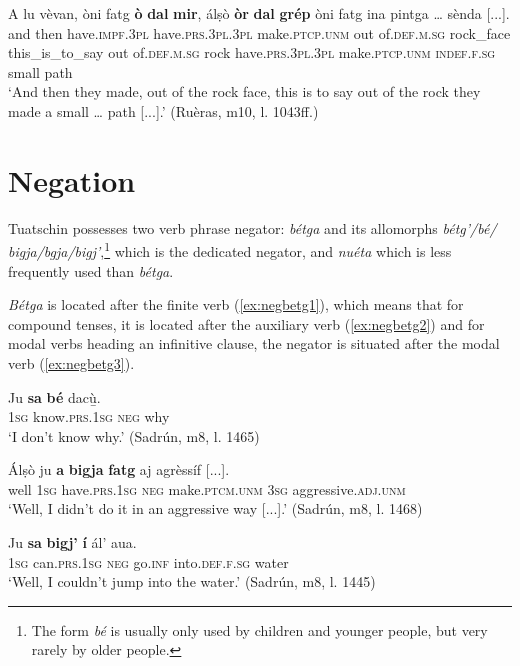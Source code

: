 \ea
\label{ex:instr:orda}
\gll  A lu vèvan, òni fatg \textbf{ò} \textbf{dal} \textbf{mir}, álṣò \textbf{òr} \textbf{dal} \textbf{grép} òni fatg ina pintga …  sènda [...].\\
and then have.\textsc{impf.3pl} have.\textsc{prs.3pl.3pl} make.\textsc{ptcp.unm} out of.\textsc{def.m.sg} rock\_face this\_is\_to\_say out of.\textsc{def.m.sg} rock have.\textsc{prs.3pl.3pl} make.\textsc{ptcp.unm} \textsc{indef.f.sg} small {} path\\
\glt `And then they made, out of the rock face, this is to say out of the rock they made a small … path [...].' (Ruèras, m10, l. 1043ff.)
\z 


\section{Negation}
Tuatschin possesses two verb phrase negator: \textit{bétga} and its allomorphs \textit{bétg'/bé/ bigja/bgja/bigj'},\footnote{The form \textit{bé} is usually only used by children and younger people, but very rarely by older people.} which is the dedicated negator, and \textit{nuéta} which is less frequently used than \textit{bétga}.

\textit{Bétga} is located after the finite verb (\ref{ex:negbetg1}), which means that for compound tenses, it is located after the auxiliary verb (\ref{ex:negbetg2}) and for modal verbs heading an infinitive clause, the negator is situated after the modal verb (\ref{ex:negbetg3}). 

\ea
\label{ex:negbetg1}
\gll Ju \textbf{sa} \textbf{bé} dacù̱.\\
\textsc{1sg} know.\textsc{prs.1sg} \textsc{neg} why \\
\glt `I don’t know why.' (Sadrún, m8, l. 1465)
\z

\ea
\label{ex:negbetg2}
\gll  Álṣò ju \textbf{a} \textbf{bigja} \textbf{fatg} aj agrèssíf [...]. \\
well \textsc{1sg} have.\textsc{prs.1sg} \textsc{neg} make.\textsc{ptcm.unm} \textsc{3sg} aggressive.\textsc{adj.unm}\\
\glt `Well, I didn’t do it in an aggressive way [...].' (Sadrún, m8, l. 1468)
\z

\ea\label{ex:negbetg3}
\gll  Ju \textbf{sa} \textbf{bigj’} \textbf{í} ál’ aua.\\
\textsc{1sg} can.\textsc{prs.1sg} \textsc{neg} go.\textsc{inf} into.\textsc{def.f.sg} water \\
\glt `Well, I couldn’t jump into the water.' (Sadrún, m8, l. 1445)
\z

